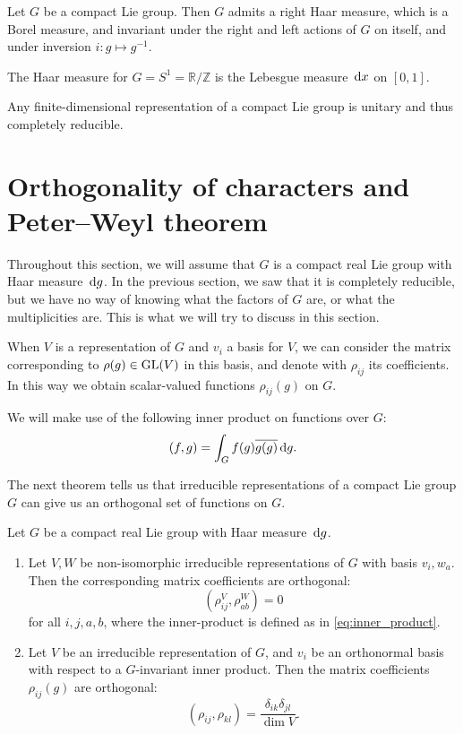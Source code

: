 \documentclass{report}
\begin{document}
\begin{theorem}
    Let $G$ be a compact Lie group.
    Then $G$ admits a right Haar measure, which is a Borel measure, and invariant under the right and left actions of $G$ on itself, and under inversion $i: g \mapsto g^{-1}$.
\end{theorem}

\begin{example}
    The Haar measure for $G= S^1 = \mathbb R/ \mathbb Z$ is the Lebesgue measure $\,\mathrm{d} x$ on $[0, 1]$.
\end{example}

\begin{theorem}\label{thm:compact_implies_unitary}
    Any finite-dimensional representation of a compact Lie group is unitary and thus completely reducible.
\end{theorem}

\section{Orthogonality of characters and Peter--Weyl theorem}
Throughout this section, we will assume that $G$ is a compact real Lie group with Haar measure $\,\mathrm{d} g$.
In the previous section, we saw that it is completely reducible, but we have no way of knowing what the factors of $G$ are, or what the multiplicities are.
This is what we will try to discuss in this section.

When $V$ is a representation of $G$ and $v_i$ a basis for $V$, we can consider the matrix corresponding to $\rho(g) \in \operatorname{{\mathrm{GL}}}(V)$ in this basis, and denote with $\rho_{ij}$ its coefficients.
In this way we obtain scalar-valued functions $\rho_{ij}(g)$ on $G$.

We will make use of the following inner product on functions over $G$:
\begin{equation}\label{eq:inner_product}
    (f, g) = \int_G f(g) \overline{g(g)} \,\mathrm{d} g.
\end{equation}

The next theorem tells us that irreducible representations of a compact Lie group $G$ can give us an orthogonal set of functions on $G$.
\begin{theorem}
    Let $G$ be a compact real Lie group with Haar measure $\,\mathrm{d} g$.
    \begin{enumerate}[label = (\roman*)]
        \item Let $V, W$ be non-isomorphic irreducible representations of $G$ with basis $v_i, w_a$.
        Then the corresponding matrix coefficients are orthogonal:
        \[
        \left( \rho^V_{ij}, \rho^W_{ab} \right) = 0
        \]
        for all $i,j,a,b$, where the inner-product is defined as in \cref{eq:inner_product}.
        \item Let $V$ be an irreducible representation of $G$, and $v_i$ be an orthonormal basis with respect to a $G$-invariant inner product.
        Then the matrix coefficients $\rho_{ij}(g)$ are orthogonal:
        \[
        \left(\rho_{ij}, \rho_{kl} \right) = \frac{ \delta_{ik} \delta_{jl} }{\dim V}.
        \]
    \end{enumerate}
\end{theorem}
\end{document}

